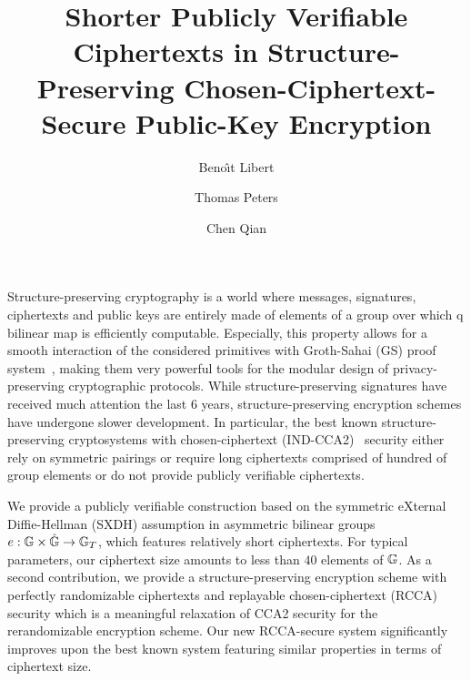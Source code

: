 \documentclass[10pt]{llncs}
\begin{document}
\title{Shorter Publicly Verifiable Ciphertexts in Structure-Preserving Chosen-Ciphertext-Secure Public-Key Encryption}

 \author{Beno\^{\i}t Libert \and Thomas Peters \and Chen Qian}
\maketitle


Structure-preserving cryptography is a world where messages, signatures, ciphertexts and public keys are entirely made of elements of a group over which q bilinear map is efficiently computable.
Especially, this property allows for a smooth interaction of the considered primitives with Groth-Sahai (GS) proof system~\cite{DBLP:journals/eccc/GrothS07}, making them very powerful tools for the modular design of privacy-preserving cryptographic protocols.
While structure-preserving signatures have received much attention the last $6$ years, structure-preserving encryption schemes have undergone slower development.
In particular, the best known  structure-preserving cryptosystems with chosen-ciphertext (IND-CCA2)~\cite{DBLP:conf/pkc/AbeDKNO13} security either rely on 
symmetric pairings or require 
long ciphertexts comprised of hundred of group elements or do not provide publicly verifiable ciphertexts.

We provide a publicly verifiable construction based on the symmetric eXternal Diffie-Hellman (SXDH) assumption in asymmetric bilinear groups
 $e : \mathbb{G} \times \hat{\mathbb{G}} \rightarrow \mathbb{G}_T$, 
which features relatively short ciphertexts.   For typical parameters, our ciphertext size amounts to less than $40$ elements of $\mathbb{G}$. 
As a second contribution, we provide a structure-preserving encryption scheme with perfectly randomizable ciphertexts and replayable 
chosen-ciphertext (RCCA) security which is a meaningful relaxation of CCA2 security for the rerandomizable encryption scheme. 
Our new RCCA-secure system significantly improves upon the best known system featuring similar properties in terms 
of ciphertext size.




 
\end{document}
